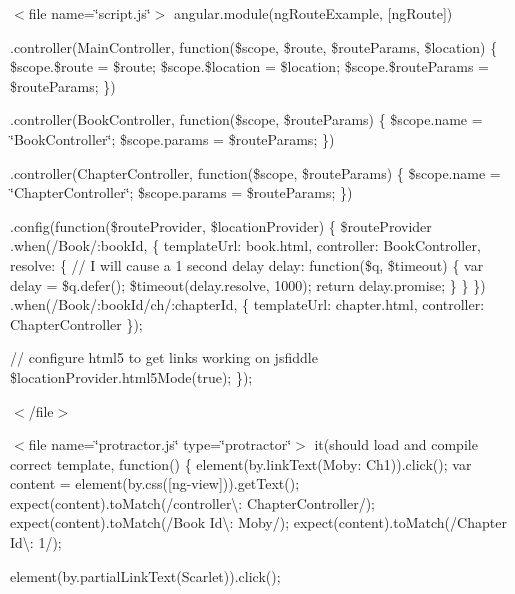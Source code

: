 $<$file name=\char`\"{}script.\+js\char`\"{}$>$ angular.\+module(\textquotesingle{}ng\+Route\+Example\textquotesingle{}, \mbox{[}\textquotesingle{}ng\+Route\textquotesingle{}\mbox{]})

.controller(\textquotesingle{}Main\+Controller\textquotesingle{}, function(\$scope, \$route, \$route\+Params, \$location) \{ \$scope.\$route = \$route; \$scope.\$location = \$location; \$scope.\$route\+Params = \$route\+Params; \})

.controller(\textquotesingle{}Book\+Controller\textquotesingle{}, function(\$scope, \$route\+Params) \{ \$scope.\+name = \char`\"{}\+Book\+Controller\char`\"{}; \$scope.\+params = \$route\+Params; \})

.controller(\textquotesingle{}Chapter\+Controller\textquotesingle{}, function(\$scope, \$route\+Params) \{ \$scope.\+name = \char`\"{}\+Chapter\+Controller\char`\"{}; \$scope.\+params = \$route\+Params; \})

.config(function(\$route\+Provider, \$location\+Provider) \{ \$route\+Provider .when(\textquotesingle{}/\+Book/\+:book\+Id\textquotesingle{}, \{ template\+Url\+: \textquotesingle{}book.\+html\textquotesingle{}, controller\+: \textquotesingle{}Book\+Controller\textquotesingle{}, resolve\+: \{ // I will cause a 1 second delay delay\+: function(\$q, \$timeout) \{ var delay = \$q.\+defer(); \$timeout(delay.\+resolve, 1000); return delay.\+promise; \} \} \}) .when(\textquotesingle{}/\+Book/\+:book\+Id/ch/\+:chapter\+Id\textquotesingle{}, \{ template\+Url\+: \textquotesingle{}chapter.\+html\textquotesingle{}, controller\+: \textquotesingle{}Chapter\+Controller\textquotesingle{} \});

// configure html5 to get links working on jsfiddle \$location\+Provider.\+html5\+Mode(true); \});

$<$/file$>$

$<$file name=\char`\"{}protractor.\+js\char`\"{} type=\char`\"{}protractor\char`\"{}$>$ it(\textquotesingle{}should load and compile correct template\textquotesingle{}, function() \{ element(by.\+link\+Text(\textquotesingle{}Moby\+: Ch1\textquotesingle{})).click(); var content = element(by.\+css(\textquotesingle{}\mbox{[}ng-\/view\mbox{]}\textquotesingle{})).get\+Text(); expect(content).to\+Match(/controller\textbackslash{}\+: Chapter\+Controller/); expect(content).to\+Match(/\+Book Id\textbackslash{}\+: Moby/); expect(content).to\+Match(/\+Chapter Id\textbackslash{}\+: 1/);

element(by.\+partial\+Link\+Text(\textquotesingle{}Scarlet\textquotesingle{})).click();

